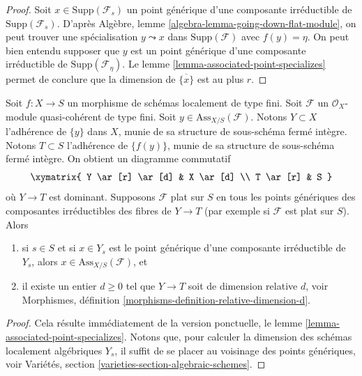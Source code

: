 \begin{proof}
Soit $x \in \text{Supp}(\mathcal{F}_s)$ un point générique d'une composante
irréductible de $\text{Supp}(\mathcal{F}_s)$. D'après
Algèbre, lemme \ref{algebra-lemma-going-down-flat-module},
on peut trouver une spécialisation $y \leadsto x$ dans $\text{Supp}(\mathcal{F})$
avec $f(y) = \eta$. On peut bien entendu supposer que $y$ est un point générique
d'une composante irréductible de $\text{Supp}(\mathcal{F}_\eta)$.
Le lemme \ref{lemma-associated-point-specializes}
permet de conclure que la dimension de $\overline{\{x\}}$ est au plus $r$.
\end{proof}

\begin{lemma}
\label{lemma-flat-associated-equidimensional}
Soit $f : X \to S$ un morphisme de schémas localement de type fini.
Soit $\mathcal{F}$ un $\mathcal{O}_X$-module quasi-cohérent de type fini.
Soit $y \in \text{Ass}_{X/S}(\mathcal{F})$.
Notons $Y \subset X$ l'adhérence de $\{y\}$ dans $X$,
munie de sa structure de sous-schéma fermé intègre. Notons $T \subset S$ l'adhérence
de $\{f(y)\}$, munie de sa structure de sous-schéma fermé intègre. On obtient
un diagramme commutatif
$$
\xymatrix{
Y \ar[r] \ar[d] & X \ar[d] \\
T \ar[r] & S
}
$$
où $Y \to T$ est dominant. Supposons $\mathcal{F}$ plat sur $S$
en tous les points génériques des composantes irréductibles des fibres de $Y \to T$
(par exemple si $\mathcal{F}$ est plat sur $S$). Alors
\begin{enumerate}
\item si $s \in S$ et si $x \in Y_s$ est le point générique d'une
composante irréductible de $Y_s$, alors $x \in \text{Ass}_{X/S}(\mathcal{F})$, et
\item il existe un entier $d \geq 0$ tel que
$Y \to T$ soit de dimension relative $d$, voir
Morphismes, définition \ref{morphisms-definition-relative-dimension-d}.
\end{enumerate}
\end{lemma}

\begin{proof}
Cela résulte immédiatement de la version ponctuelle,
le lemme \ref{lemma-associated-point-specializes}.
Notons que, pour calculer la dimension des schémas
localement algébriques $Y_s$, il suffit de se placer au voisinage
des points génériques, voir Variétés, section
\ref{varieties-section-algebraic-schemes}.
\end{proof}


